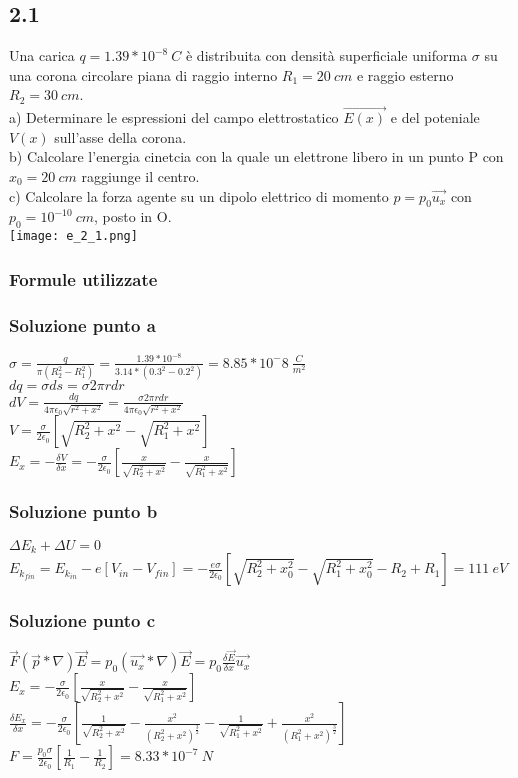 \documentclass[../../main.tex]{subfiles}
\begin{document}
\subsection*{2.1}
Una carica $q = 1.39 * 10^{-8}\ C$ è distribuita con densità superficiale uniforma $\sigma$ su una corona circolare piana di raggio interno $R_1 = 20\ cm$ e raggio esterno $R_2 = 30\ cm$.
\\a) Determinare le espressioni del campo elettrostatico $\vec{E(x)}$ e del poteniale $V(x)$ sull'asse della corona.
\\b) Calcolare l'energia cinetcia con la quale un elettrone libero in un punto P con $x_0 = 20\ cm$ raggiunge il centro.
\\c) Calcolare la forza agente su un dipolo elettrico di momento $p = p_0\vec{u_x}$ con $p_0 = 10^{-10}\ cm$, posto in O.
\\\texttt{[image: e\_2\_1.png]}
\subsubsection*{Formule utilizzate}

\subsubsection*{Soluzione punto a}
$\sigma = \frac{q}{\pi(R_2^2-R_1^2)} = \frac{1.39 * 10^{-8}}{3.14 * (0.3^2 - 0.2^2)} = 8.85 * 10^-8\ \frac{C}{m^2}$
\\$dq = \sigma ds = \sigma 2\pi rdr$
\\$dV = \frac{dq}{4\pi\epsilon_0\sqrt{r^2 + x^2}} = \frac{\sigma 2 \pi rdr}{4\pi\epsilon_0\sqrt{r^2+x^2}}$
\\$V = \frac{\sigma}{2\epsilon_0}\left[\sqrt{R_2^2 + x^2} - \sqrt{R_1^2 + x^2}\right]$
\\$E_x = -\frac{\delta V}{\delta x} = -\frac{\sigma}{2\epsilon_0}\left[\frac{x}{\sqrt{R_2^2 + x^2}} -\frac{x}{\sqrt{R_1^2+x^2}}\right]$
\subsubsection*{Soluzione punto b}
$\Delta E_k + \Delta U = 0$
\\$E_{k_{fin}} = E_{k_{in}} - e[V_{in} - V_{fin}] = -\frac{e\sigma}{2\epsilon_0}\left[\sqrt{R_2^2 + x_0^2}-\sqrt{R_1^2 + x_0^2}-R_2 + R_1\right] =111\ eV$
\subsubsection*{Soluzione punto c}
$\vec{F}\left(\vec{p}*\nabla\right)\vec{E} = p_0\left(\vec{u_x} * \nabla \right)\vec{E} = p_0 \frac{\delta \vec{E}}{\delta x}\vec{u_x}$
\\$E_x = -\frac{\sigma}{2\epsilon_0}\left[\frac{x}{\sqrt{R_2^2 + x^2}}-\frac{x}{\sqrt{R_1^2 +x^2}}\right]$
\\$\frac{\delta E_x}{\delta x} = -\frac{\sigma}{2\epsilon_0}\left[\frac{1}{\sqrt{R_2^2 + x^2}} - \frac{x^2}{(R_2^2 + x^2)^{\frac{3}{2}}}-\frac{1}{\sqrt{R_1^2 + x^2}} + \frac{x^2}{(R_1^2 + x^2)^{\frac{3}{2}}}\right]$
\\$F = \frac{p_0 \sigma}{2\epsilon_0}\left[\frac{1}{R_1}-\frac{1}{R_2}\right] = 8.33*10^{-7}\ N$
\newpage
\end{document}
